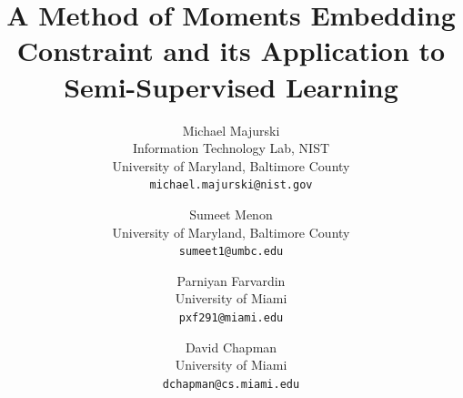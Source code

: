 \documentclass[10pt,twocolumn,letterpaper]{article}
\begin{document}
	
	\title{A Method of Moments Embedding Constraint and its Application to Semi-Supervised Learning}
	
	\author{Michael Majurski\\
		Information Technology Lab, NIST\\
		University of Maryland, Baltimore County\\
		{\tt\small michael.majurski@nist.gov}
	\and
	Sumeet Menon\\
	University of Maryland, Baltimore County\\
	{\tt\small sumeet1@umbc.edu}
	\and
	Parniyan Farvardin\\
	University of Miami\\
	{\tt\small pxf291@miami.edu}
	\and
	David Chapman\\
	University of Miami\\
	{\tt\small dchapman@cs.miami.edu}
}

\maketitle
\end{document}
